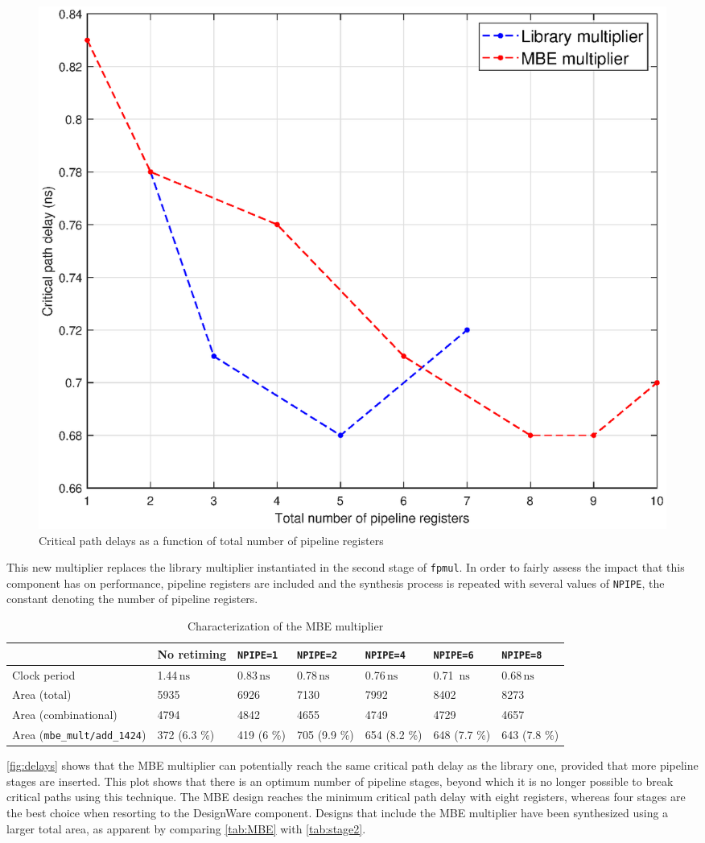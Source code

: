 \begin{figure}
	\includegraphics[width=\textwidth]{chapter2/images/delays.eps}
	\caption{Critical path delays as a function of total number of pipeline registers}
	\label{fig:delays}
\end{figure}
This new multiplier replaces the library multiplier instantiated in the second stage of \texttt{fpmul}. In order to fairly assess the impact that this component has on performance, pipeline registers are included and the synthesis process is repeated with several values of \texttt{NPIPE}, the constant denoting the number of pipeline registers.
\begin{table}
\begin{tabular}{|l|l|l|l|l|l|l|}\hline
	& No retiming & \texttt{NPIPE=1} & \texttt{NPIPE=2} & \texttt{NPIPE=4} & \texttt{NPIPE=6} & \texttt{NPIPE=8}\\\hline
	Clock period & 1.44$\,\textrm{ns}$ & 0.83$\,\textrm{ns}$& 0.78$\,\textrm{ns}$& 0.76$\,\textrm{ns}$ & 0.71 $\,\textrm{ns}$& 0.68$\,\textrm{ns}$ \\\hline
	Area (total) & 5935 & 6926 & 7130 & 7992 & 8402 & 8273 \\\hline
	Area (combinational) & 4794 & 4842 & 4655 & 4749 & 4729 & 4657 \\\hline
	Area (\texttt{mbe\_mult/add\_1424}) & 372 (6.3 \%)  & 419 (6 \%)  &  705 (9.9 \%)& 654 (8.2 \%) & 648 (7.7 \%) & 643 (7.8 \%)\\\hline
\end{tabular}
\caption{Characterization of the MBE multiplier}
\label{tab:MBE}
\end{table}
\autoref{fig:delays} shows that the MBE multiplier can potentially reach the same critical path delay as the library one, provided that more pipeline stages are inserted. This plot shows that there is an optimum number of pipeline stages, beyond which it is no longer possible to break critical paths using this technique. The MBE design reaches the minimum critical path delay with eight registers, whereas four stages are the best choice when resorting to the DesignWare component. Designs that include the MBE multiplier have been synthesized using a larger total area, as apparent by comparing \autoref{tab:MBE} with \autoref{tab:stage2}.
